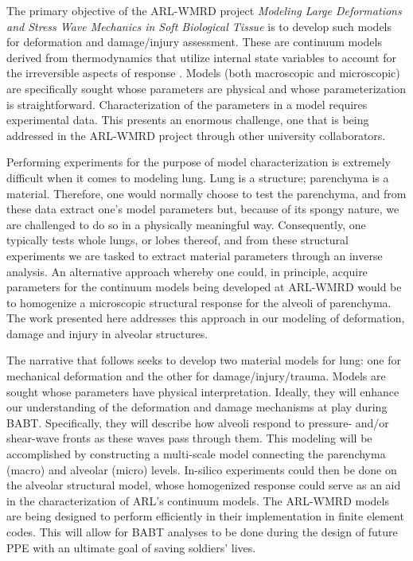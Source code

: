 The primary objective of the ARL-WMRD project \textit{Modeling Large Deformations and Stress Wave Mechanics in Soft Biological Tissue\/} is to develop such models for deformation and damage\slash injury assessment.  These are continuum models derived from thermo\-dynamics that utilize internal state variables to account for the irreversible aspects of response \cite{ClaytonFreed19,ClaytonFreed20}.  Models (both macro\-scopic and micro\-scopic) are specifically sought whose parameters are physical and whose parameterization is straightforward.  Characterization of the parameters in a model requires experimental data.  This presents an enormous challenge, one that is being addressed in the ARL-WMRD project through other university collaborators.  

Performing experiments for the purpose of model characterization is extremely difficult when it comes to modeling lung.  Lung is a structure; parenchyma is a material.  Therefore, one would normally choose to test the parenchyma, and from these data extract one's model parameters but, because of its spongy nature, we are challenged to do so in a physically meaningful way.  Consequently, one typically tests whole lungs, or lobes thereof, and from these structural experiments we are tasked to extract material parameters through an inverse analysis.  An alternative approach whereby one could, in principle, acquire parameters for the continuum models being developed at ARL-WMRD would be to homo\-genize a microscopic structural response for the alveoli of parenchyma.  The work presented here addresses this approach in our modeling of deformation, damage and injury in alveolar structures.

The narrative that follows seeks to develop two material models for lung: one for mechanical deformation and the other for damage\slash injury\slash trauma.  Models are sought whose parameters have physical interpretation.  Ideally, they will enhance our understanding of the deformation and damage mechanisms at play during BABT.  Specifically, they will describe how alveoli respond to pressure- and\slash or shear-wave fronts as these waves pass through them.  This modeling will be accomplished by constructing a multi-scale model connecting the parenchyma (macro) and alveolar (micro) levels.  In-silico experiments could then be done on the alveolar structural model, whose homogenized response could serve as an aid in the characterization of ARL's continuum models.  The ARL-WMRD models are being designed to perform efficiently in their implementation in finite element codes.  This will allow for BABT analyses to be done during the design of future PPE with an ultimate goal of saving soldiers' lives.

